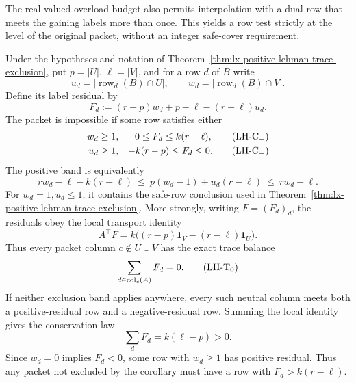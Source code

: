 The real-valued overload budget also permits interpolation with a dual row
that meets the gaining labels more than once.  This yields a row test strictly
at the level of the original packet, without an integer safe-cover
requirement.

\begin{corollary}
\label{cor:lx-convex-lehman-row}
Under the hypotheses and notation of
Theorem~\ref{thm:lx-positive-lehman-trace-exclusion}, put
$p=|U|$, $\ell=|V|$, and for a row $d$ of $B$ write
\[
 u_d=|\operatorname{row}_d(B)\cap U|,\qquad
 w_d=|\operatorname{row}_d(B)\cap V|.
\]
Define its label residual by
\[
 F_d:=(r-p)w_d+p-\ell-(r-\ell)u_d.                 \tag{LH-R}
 \label{eq:lx-lehman-label-residual}
\]
The packet is impossible if some row satisfies either
\begin{align}
 w_d&\geq1,&0\leq F_d\leq k(r-\ell),               \tag{LH-C${}_+$}
 \label{eq:lx-convex-lehman-positive-band}\\
 u_d&\geq1,&-k(r-p)\leq F_d\leq0.                  \tag{LH-C${}_-$}
 \label{eq:lx-convex-lehman-negative-band}
\end{align}
The positive band is equivalently
\[
 rw_d-\ell-k(r-\ell)
 \ \leq\ p(w_d-1)+u_d(r-\ell)
 \ \leq\ rw_d-\ell.                              \tag{LH-C}
 \label{eq:lx-convex-lehman-band}
\]
For $w_d=1,u_d\leq1$, it contains the safe-row conclusion used in
Theorem~\ref{thm:lx-positive-lehman-trace-exclusion}.
More strongly, writing $F=(F_d)_d$, the residuals obey the local transport
identity
\[
 A^\top F
 =k\bigl((r-p)\mathbf1_V-(r-\ell)\mathbf1_U\bigr). \tag{LH-T}
 \label{eq:lx-lehman-residual-transport}
\]
Thus every packet column $c\notin U\cup V$ has the exact trace balance
\[
 \sum_{d\in\operatorname{col}_c(A)}F_d=0.          \tag{LH-T${}_0$}
 \label{eq:lx-lehman-neutral-column-balance}
\]
If neither exclusion band applies anywhere, every such neutral column meets
both a positive-residual row and a negative-residual row.
Summing the local identity gives the conservation law
\[
 \sum_d F_d=k(\ell-p)>0.                            \tag{LH-S}
 \label{eq:lx-lehman-residual-sum}
\]
Since $w_d=0$ implies $F_d<0$, some row with $w_d\geq1$ has positive
residual.  Thus any packet not excluded by the corollary must have a row
with $F_d>k(r-\ell)$.
\end{corollary}

